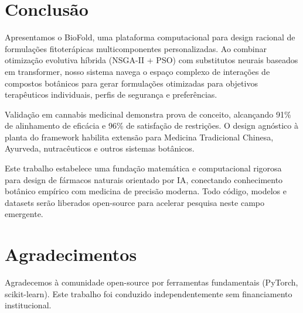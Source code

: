 \documentclass[11pt,a4paper]{article}
\begin{document}
\section{Conclusão}

Apresentamos o BioFold, uma plataforma computacional para design racional de formulações fitoterápicas multicomponentes personalizadas. Ao combinar otimização evolutiva híbrida (NSGA-II + PSO) com substitutos neurais baseados em transformer, nosso sistema navega o espaço complexo de interações de compostos botânicos para gerar formulações otimizadas para objetivos terapêuticos individuais, perfis de segurança e preferências.

Validação em cannabis medicinal demonstra prova de conceito, alcançando 91\% de alinhamento de eficácia e 96\% de satisfação de restrições. O design agnóstico à planta do framework habilita extensão para Medicina Tradicional Chinesa, Ayurveda, nutracêuticos e outros sistemas botânicos.

Este trabalho estabelece uma fundação matemática e computacional rigorosa para design de fármacos naturais orientado por IA, conectando conhecimento botânico empírico com medicina de precisão moderna. Todo código, modelos e datasets serão liberados open-source para acelerar pesquisa neste campo emergente.

\section*{Agradecimentos}

Agradecemos à comunidade open-source por ferramentas fundamentais (PyTorch, scikit-learn). Este trabalho foi conduzido independentemente sem financiamento institucional.
\end{document}
